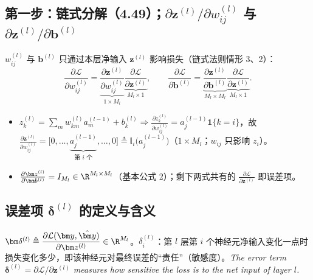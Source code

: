 \subsection{第一步：链式分解（4.49）；\texorpdfstring{$\partial\bm z^{(l)}/\partial w^{(l)}_{ij}$}{dz/dw\_ij} 与 \texorpdfstring{$\partial\bm z^{(l)}/\partial\bm b^{(l)}$}{dz/db}}
$w^{(l)}_{ij}$ 与 $\bm b^{(l)}$ 只通过本层净输入 $\bm z^{(l)}$ 影响损失（链式法则情形 3、2）：
\begin{equation}
\frac{\partial\mathcal L}{\partial w^{(l)}_{ij}}=\underbrace{\frac{\partial\bm z^{(l)}}{\partial w^{(l)}_{ij}}}_{1\times M_l}\underbrace{\frac{\partial\mathcal L}{\partial\bm z^{(l)}}}_{M_l\times1},\qquad
\frac{\partial\mathcal L}{\partial\bm b^{(l)}}=\underbrace{\frac{\partial\bm z^{(l)}}{\partial\bm b^{(l)}}}_{M_l\times M_l}\underbrace{\frac{\partial\mathcal L}{\partial\bm z^{(l)}}}_{M_l\times1}.\tag{4.49}
\end{equation}
\begin{itemize}
\item $z^{(l)}_k=\sum_mw^{(l)}_{km}a^{(l-1)}_m+b^{(l)}_k\Rightarrow\frac{\partial z^{(l)}_k}{\partial w^{(l)}_{ij}}=a^{(l-1)}_j\mathbf 1\{k=i\}$，故 $\frac{\partial\bm z^{(l)}}{\partial w^{(l)}_{ij}}=\big[0,\dots,\underbrace{a^{(l-1)}_j}_{\text{第 }i\text{ 个}},\dots,0\big]\triangleq\mathbb I_i\big(a^{(l-1)}_j\big)$（$1\times M_l$；$w_{ij}$ 只影响 $z_i$）。
\item $\frac{\partial\bm z^{(l)}}{\partial\bm b^{(l)}}=I_{M_l}\in\R^{M_l\times M_l}$（基本公式 2）；剩下两式共有的 $\frac{\partial\mathcal L}{\partial\bm z^{(l)}}$ 即误差项。
\end{itemize}

\subsection{误差项 \texorpdfstring{$\bm\delta^{(l)}$}{delta(l)} 的定义与含义}
$\bm\delta^{(l)}\triangleq\dfrac{\partial\mathcal L(\bm y,\hat{\bm y})}{\partial\bm z^{(l)}}\in\R^{M_l}$。$\delta^{(l)}_i$：第 $l$ 层第 $i$ 个神经元净输入变化一点时损失变化多少，即该神经元对最终误差的“责任”（敏感度）。\textit{The error term $\bm\delta^{(l)}=\partial\mathcal L/\partial\bm z^{(l)}$ measures how sensitive the loss is to the net input of layer $l$.}

